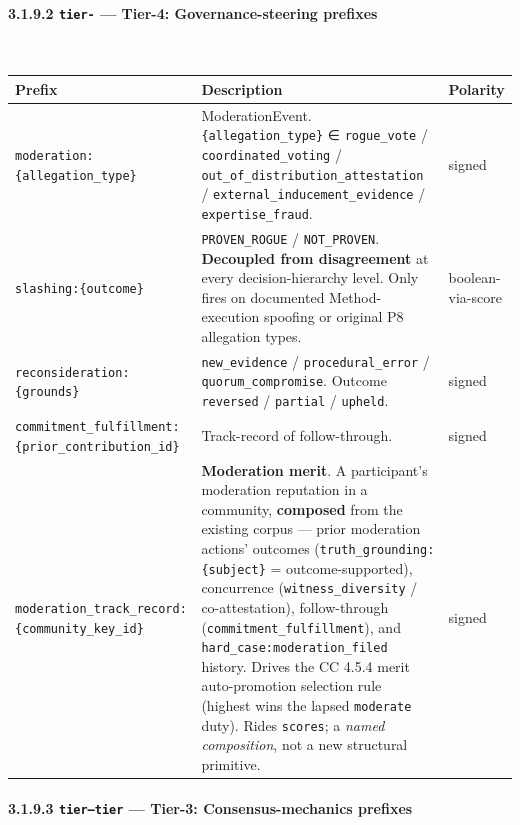 \documentclass[11pt]{article}
\begin{document}
\paragraph{3.1.9.2 \texttt{tier-} — Tier-4: Governance-steering prefixes}\mbox{}\\


{\footnotesize
\begin{longtable}{|p{5.33cm}|p{5.33cm}|p{5.33cm}|}\hline
\textbf{Prefix} & \textbf{Description} & \textbf{Polarity} \\ \hline\endhead
\texttt{moderation:\{allegation\_type\}} & ModerationEvent. \texttt{\{allegation\_type\}} ∈ \texttt{rogue\_vote} / \texttt{coordinated\_voting} / \texttt{out\_of\_distribution\_attestation} / \texttt{external\_inducement\_evidence} / \texttt{expertise\_fraud}. & signed \\ \hline
\texttt{slashing:\{outcome\}} & \texttt{PROVEN\_ROGUE} / \texttt{NOT\_PROVEN}. \textbf{Decoupled from disagreement} at every decision-hierarchy level. Only fires on documented Method-execution spoofing or original P8 allegation types. & boolean-via-score \\ \hline
\texttt{reconsideration:\{grounds\}} & \texttt{new\_evidence} / \texttt{procedural\_error} / \texttt{quorum\_compromise}. Outcome \texttt{reversed} / \texttt{partial} / \texttt{upheld}. & signed \\ \hline
\texttt{commitment\_fulfillment:\{prior\_contribution\_id\}} & Track-record of follow-through. & signed \\ \hline
\texttt{moderation\_track\_record:\{community\_key\_id\}} & \textbf{Moderation merit}. A participant's moderation reputation in a community, \textbf{composed} from the existing corpus — prior moderation actions' outcomes (\texttt{truth\_grounding:\{subject\}} = outcome-supported), concurrence (\texttt{witness\_diversity} / co-attestation), follow-through (\texttt{commitment\_fulfillment}), and \texttt{hard\_case:moderation\_filed} history. Drives the CC 4.5.4 merit auto-promotion selection rule (highest wins the lapsed \texttt{moderate} duty). Rides \texttt{scores}; a \textit{named composition}, not a new structural primitive. & signed \\ \hline
\end{longtable}}


\paragraph{3.1.9.3 \texttt{tier--tier} — Tier-3: Consensus-mechanics prefixes}\mbox{}\\
\end{document}
